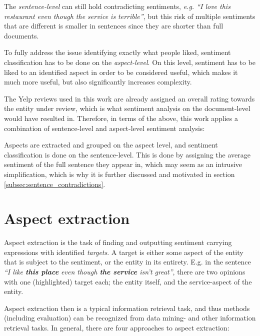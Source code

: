 \documentclass[a4paper,11pt]{kth-mag}
\begin{document}
The \emph{sentence-level} can still hold contradicting sentiments,
\emph{e.g. ``I love this restaurant even though the service is terrible''},
but this risk of multiple sentiments that are different is smaller in sentences
since they are shorter than full documents.

To fully address the issue identifying exactly what people liked,
sentiment classification has to be done on the \emph{aspect-level}.
On this level, sentiment has to be liked to an identified aspect in order to be considered
useful, which makes it much more useful, but also significantly increases complexity\cite[Chapter~1.2]{liu2012sentiment}.

The Yelp reviews used in this work are already assigned an overall rating towards the entity under
review, which is what sentiment analysis on the document-level would have resulted in.
Therefore, in terms of the above, this work applies a combination of sentence-level and aspect-level
sentiment analysis:

Aspects are extracted and grouped on the aspect level, and sentiment classification is done on
the sentence-level. This is done by assigning the average sentiment of the full sentence they appear in,
which may seem as an intrusive simplification, which is why it is
further discussed and motivated in section \ref{subsec:sentence_contradictions}.







\chapter{Aspect extraction}

Aspect extraction is the task of finding and outputting sentiment carrying expressions
with identified \emph{targets}. A target is either some aspect of the entity that is
subject to the sentiment, or the entity in its entirety. E.g. in the sentence
\emph{``I like \textbf{this place} even though \textbf{the service} isn't great''},
there are two opinions with one (highlighted) target each; the entity itself, and the
service-aspect of the entity.

Aspect extraction then is a typical information retrieval task, and thus methods
(including evaluation) can be recognized from data mining- and other information retrieval tasks.
In general, there are four approaches to aspect extraction\cite[chapter 5.3]{liu2012sentiment}:
\end{document}

